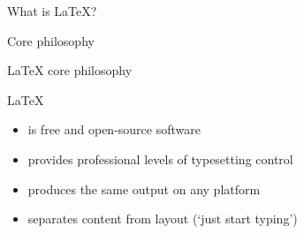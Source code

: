 \documentclass{beamer}
\begin{document}
\begin{frame}{What is \LaTeX?}
\end{frame}

\begin{frame}{Core philosophy}

    \LaTeX{} core philosophy

    \begin{block}{\LaTeX}
        \begin{itemize}
            \item<1-> is free and open-source software
            \item<2-> provides professional levels of typesetting control
            \item<3-> produces the same output on any platform
            \item<4-> separates content from layout (`just start typing')
        \end{itemize}
    \end{block}

    \bigskip


    \medskip

\end{frame}
\end{document}

